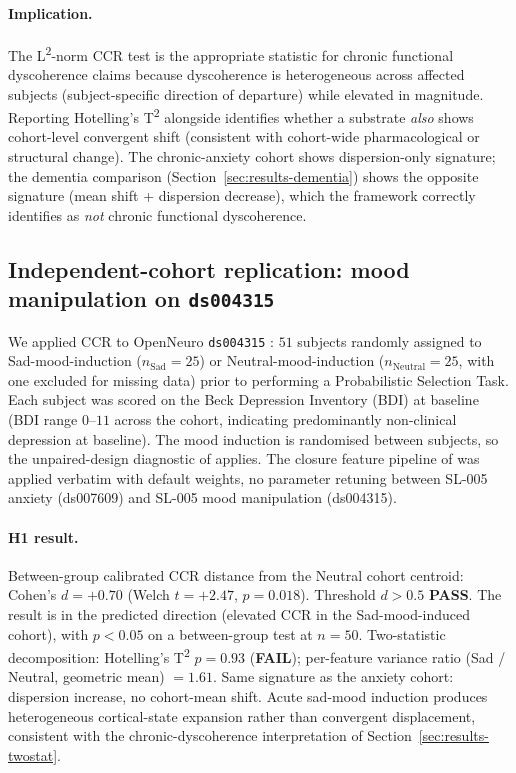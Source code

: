 \documentclass[11pt,a4paper]{article}
\begin{document}
\paragraph{Implication.} The L\textsuperscript{2}-norm CCR test is the appropriate statistic for chronic functional dyscoherence claims because dyscoherence is heterogeneous across affected subjects (subject-specific direction of departure) while elevated in magnitude. Reporting Hotelling's T\textsuperscript{2} alongside identifies whether a substrate \emph{also} shows cohort-level convergent shift (consistent with cohort-wide pharmacological or structural change). The chronic-anxiety cohort shows dispersion-only signature; the dementia comparison (Section~\ref{sec:results-dementia}) shows the opposite signature (mean shift + dispersion decrease), which the framework correctly identifies as \emph{not} chronic functional dyscoherence.

\subsection{Independent-cohort replication: mood manipulation on \texttt{ds004315}}\label{sec:results-mood}

We applied CCR to OpenNeuro \texttt{ds004315} \citep{CavanaghMoodManipulation}: $51$ subjects randomly assigned to Sad-mood-induction ($n_{\mathrm{Sad}} = 25$) or Neutral-mood-induction ($n_{\mathrm{Neutral}} = 25$, with one excluded for missing data) prior to performing a Probabilistic Selection Task. Each subject was scored on the Beck Depression Inventory (BDI) at baseline (BDI range $0$--$11$ across the cohort, indicating predominantly non-clinical depression at baseline). The mood induction is randomised between subjects, so the unpaired-design diagnostic of \citep{SmartClosureDistance} applies. The closure feature pipeline of \citep{SolutionLab002} was applied verbatim with default weights, no parameter retuning between SL-005 anxiety (ds007609) and SL-005 mood manipulation (ds004315).

\paragraph{H1 result.} Between-group calibrated CCR distance from the Neutral cohort centroid: Cohen's $d = +0.70$ (Welch $t = +2.47$, $p = 0.018$). Threshold $d > 0.5$ \textbf{PASS}. The result is in the predicted direction (elevated CCR in the Sad-mood-induced cohort), with $p < 0.05$ on a between-group test at $n = 50$. Two-statistic decomposition: Hotelling's T\textsuperscript{2} $p = 0.93$ (\textbf{FAIL}); per-feature variance ratio (Sad / Neutral, geometric mean) $= \mathbf{1.61}$. Same signature as the anxiety cohort: dispersion increase, no cohort-mean shift. Acute sad-mood induction produces heterogeneous cortical-state expansion rather than convergent displacement, consistent with the chronic-dyscoherence interpretation of Section~\ref{sec:results-twostat}.
\end{document}
